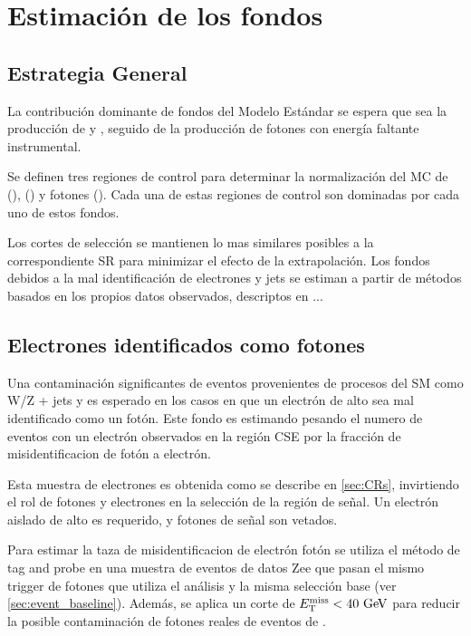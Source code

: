\chapter{Estimación de los fondos} \label{cap:fondos}


\section{Estrategia General}

La contribuci\'on dominante de fondos del Modelo Estándar se espera que sea la producción de
{\wgam} y {\ttgam}, seguido de la producción de fotones con energía faltante instrumental.

Se definen tres regiones de control para determinar la normalización del MC de {\wgam} ({\CRW}),
{\ttgam} ({\CRT}) y fotones ({\CRQ}). Cada una de estas regiones de control son dominadas por cada uno
de estos fondos.

Los cortes de selecci\'on se mantienen lo mas similares posibles a la correspondiente SR para
minimizar el efecto de la extrapolaci\'on. Los fondos debidos a la mal identificaci\'on de
electrones y jets se estiman a partir de métodos basados en los propios datos observados,
descriptos en ...

\section{Electrones identificados como fotones} \label{sec:efakes}

Una contaminación significantes de eventos provenientes de procesos del SM
como W/Z + jets y {\tt} es esperado en los casos en que un electrón de alto
{\pt} sea mal identificado como un fotón. Este fondo es estimando pesando
el numero de eventos con un electrón observados en la región CSE por la
fracción de misidentificacion de fotón a electrón.

Esta muestra de electrones es obtenida como se describe en \cref{sec:CRs},
invirtiendo el rol de fotones y electrones en la selección de la región de señal.
Un electrón aislado de alto {\pt}  es requerido, y fotones de señal son vetados.

Para estimar la taza de misidentificacion de electrón fotón se utiliza el método
de tag and probe en una muestra de eventos de datos Zee que pasan el mismo trigger
de fotones que utiliza el análisis y la misma selección base (ver \cref{sec:event_baseline}).
Además, se aplica un corte de $\met  < 40 \gev$ para reducir la posible contaminación de fotones
reales de eventos de {\wgam}.

